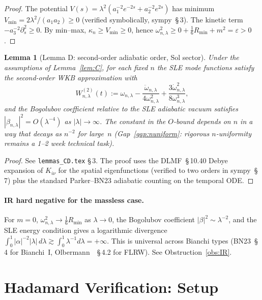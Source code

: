 \documentclass[11pt,a4paper]{article}
\newtheorem{lemma}[theorem]{Lemma}
\theoremstyle{definition}
\begin{document}
\begin{proof}
The potential $V(s)=\lambda^2(a_1^{-2}e^{-2s}+a_2^{-2}e^{2s})$ has minimum
$V_{\min}=2\lambda^2/(a_1 a_2)\geq 0$ (verified symbolically, sympy~\S\,3).
The kinetic term $-a_3^{-2}\partial_s^2\geq 0$.  By min--max,
$\kappa_n\geq V_{\min}\geq 0$, hence
$\omega^2_{n,\lambda}\geq 0+\tfrac{1}{6}R_{\min}+m^2=\varepsilon>0$.
\end{proof}

\begin{lemma}[Lemma D: second-order adiabatic order, Sol sector]\label{lem:D}
Under the assumptions of Lemma~\ref{lem:C}, for each fixed $n$
the SLE mode functions satisfy the second-order WKB approximation with
\[
  W^{(2)}_{n,\lambda}(t) := \omega_{n,\lambda} - \frac{\ddot\omega_{n,\lambda}}{4\omega^2_{n,\lambda}}
  + \frac{3\dot\omega^2_{n,\lambda}}{8\omega^3_{n,\lambda}},
\]
and the Bogolubov coefficient relative to the SLE adiabatic vacuum satisfies
$|\beta_{n,\lambda}|^2 = O(\lambda^{-4})$ as $|\lambda|\to\infty$.
The constant in the $O$-bound depends on $n$ in a way that decays as
$n^{-2}$ for large~$n$ (Gap~\ref{gap:nuniform}: rigorous $n$-uniformity
remains a 1--2 week technical task).
\end{lemma}

\begin{proof}
See \texttt{lemmas\_CD.tex} \S\,3.  The proof uses the DLMF~\S\,10.40
Debye expansion of $K_{i\nu}$ for the spatial eigenfunctions
(verified to two orders in sympy~\S\,7) plus the standard Parker--BN23
adiabatic counting on the temporal ODE.
\end{proof}

\paragraph{IR hard negative for the massless case.}
For $m=0$, $\omega^2_{n,\lambda}\to \tfrac{1}{6}R_{\min}$ as $\lambda\to 0$,
the Bogolubov coefficient $|\beta|^2\sim \lambda^{-2}$, and the SLE energy
condition gives a logarithmic divergence
$\int_0^1 |\alpha|^{-2}|\lambda|\,d\lambda \gtrsim \int_0^1 \lambda^{-1}d\lambda = +\infty$.
This is universal across Bianchi types (BN23~\S\,4 for Bianchi~I,
Olbermann~\cite{Olb07}~\S\,4.2 for FLRW).  See Obstruction~\ref{obs:IR}.

\section{Hadamard Verification: Setup}
\label{sec:hadamard}
\end{document}
